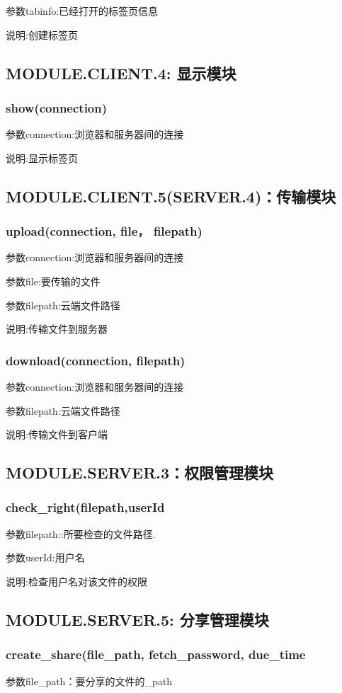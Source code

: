 参数tabinfo:已经打开的标签页信息

说明:创建标签页
\subsection{MODULE.CLIENT.4: 显示模块}

\subsubsection{show(connection)}
参数connection:浏览器和服务器间的连接

说明:显示标签页
\subsection{MODULE.CLIENT.5(SERVER.4)：传输模块}
\subsubsection{upload(connection, file， filepath)}
参数connection:浏览器和服务器间的连接

参数file:要传输的文件

参数filepath:云端文件路径

说明:传输文件到服务器
\subsubsection{download(connection, filepath)}

参数connection:浏览器和服务器间的连接

参数filepath:云端文件路径

说明:传输文件到客户端
\subsection{MODULE.SERVER.3：权限管理模块}
\subsubsection{check\_right(filepath,userId}
参数filepath::所要检查的文件路径.

参数userId:用户名

说明:检查用户名对该文件的权限

\subsection{MODULE.SERVER.5: 分享管理模块}
\subsubsection{create\_share(file\_path, fetch\_password, due\_time}
参数file\_path：要分享的文件的\_path

